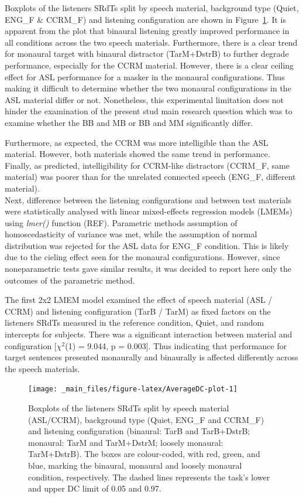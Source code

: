 \documentclass[a4paper, twoside]{templates/ociamthesis}
\begin{document}
Boxplots of the listeners SRdTs split by speech material, background type (Quiet, ENG\_F \& CCRM\_F) and listening configuration are shown in Figure~\ref{fig:AverageDC-plot}.
It is apparent from the plot that binaural listening greatly improved performance in all conditions across the two speech materials. Furthermore, there is a clear trend for monaural target with binaural distractor (TarM+DstrB) to further degrade performance, especially for the CCRM material. However, there is a clear ceiling effect for ASL performance for a masker in the monaural configurations. Thus making it difficult to determine whether the two monaural configurations in the ASL material differ or not. Nonetheless, this experimental limitation does not hinder the examination of the present stud main research question which was to examine whether the BB and MB or BB and MM significantly differ.

Furthermore, as expected, the CCRM was more intelligible than the ASL material. However, both materials showed the same trend in performance. Finally, as predicted, intelligibility for CCRM-like distractors (CCRM\_F, same material) was poorer than for the unrelated connected speech (ENG\_F, different material).\\

Next, difference between the listening configurations and between test materials were statistically analysed with linear mixed-effects regression models (LMEMs) using \emph{lmer()} function (REF). Parametric methods assumption of homoscedasticity of variance was met, while the assumption of normal distribution was rejected for the ASL data for ENG\_F condition. This is likely due to the cieling effect seen for the monaural configurations. However, since noneparametric tests gave similar results, it was decided to report here only the outcomes of the parametric method.

The first 2x2 LMEM model examined the effect of speech material (ASL / CCRM) and listening configuration (TarB / TarM) as fixed factors on the listeners SRdTs measured in the reference condition, Quiet, and random intercepts for subjects. There was a significant interaction between material and configuration {[}\(\chi^2\)(1) = 9.044, p = 0.003{]}. Thus indicating that performance for target sentences presented monaurally and binaurally is affected differently across the speech materials.

\begin{figure}

{\centering \texttt{[image: \_main\_files/figure-latex/AverageDC-plot-1]} 

}

\caption{Boxplots of the listeners SRdTs split by speech material (ASL/CCRM), background type (Quiet, ENG\_F and CCRM\_F) and listening configuration (binaural: TarB and TarB+DstrB; monaural: TarM and TarM+DstrM; loosely monaural: TarM+DstrB). The boxes are colour-coded, with red, green, and blue, marking the binaural, monaural and loosely monaural condition, respectively. The dashed lines represents the task's lower and upper DC limit of 0.05 and 0.97.}\label{fig:AverageDC-plot}
\end{figure}
\end{document}
